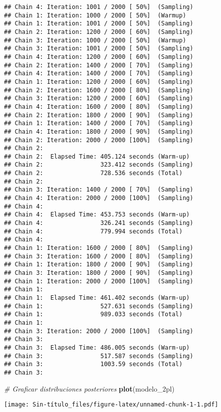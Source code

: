 \documentclass[
]{article}
\newenvironment{Shaded}{\begin{snugshade}}{\end{snugshade}}
\newcommand{\CommentTok}[1]{\textcolor[rgb]{0.56,0.35,0.01}{\textit{#1}}}
\newcommand{\FunctionTok}[1]{\textcolor[rgb]{0.13,0.29,0.53}{\textbf{#1}}}
\newcommand{\NormalTok}[1]{#1}
\begin{document}
\begin{verbatim}
## Chain 4: Iteration: 1001 / 2000 [ 50%]  (Sampling)
## Chain 1: Iteration: 1000 / 2000 [ 50%]  (Warmup)
## Chain 1: Iteration: 1001 / 2000 [ 50%]  (Sampling)
## Chain 2: Iteration: 1200 / 2000 [ 60%]  (Sampling)
## Chain 3: Iteration: 1000 / 2000 [ 50%]  (Warmup)
## Chain 3: Iteration: 1001 / 2000 [ 50%]  (Sampling)
## Chain 4: Iteration: 1200 / 2000 [ 60%]  (Sampling)
## Chain 2: Iteration: 1400 / 2000 [ 70%]  (Sampling)
## Chain 4: Iteration: 1400 / 2000 [ 70%]  (Sampling)
## Chain 1: Iteration: 1200 / 2000 [ 60%]  (Sampling)
## Chain 2: Iteration: 1600 / 2000 [ 80%]  (Sampling)
## Chain 3: Iteration: 1200 / 2000 [ 60%]  (Sampling)
## Chain 4: Iteration: 1600 / 2000 [ 80%]  (Sampling)
## Chain 2: Iteration: 1800 / 2000 [ 90%]  (Sampling)
## Chain 1: Iteration: 1400 / 2000 [ 70%]  (Sampling)
## Chain 4: Iteration: 1800 / 2000 [ 90%]  (Sampling)
## Chain 2: Iteration: 2000 / 2000 [100%]  (Sampling)
## Chain 2: 
## Chain 2:  Elapsed Time: 405.124 seconds (Warm-up)
## Chain 2:                323.412 seconds (Sampling)
## Chain 2:                728.536 seconds (Total)
## Chain 2: 
## Chain 3: Iteration: 1400 / 2000 [ 70%]  (Sampling)
## Chain 4: Iteration: 2000 / 2000 [100%]  (Sampling)
## Chain 4: 
## Chain 4:  Elapsed Time: 453.753 seconds (Warm-up)
## Chain 4:                326.241 seconds (Sampling)
## Chain 4:                779.994 seconds (Total)
## Chain 4: 
## Chain 1: Iteration: 1600 / 2000 [ 80%]  (Sampling)
## Chain 3: Iteration: 1600 / 2000 [ 80%]  (Sampling)
## Chain 1: Iteration: 1800 / 2000 [ 90%]  (Sampling)
## Chain 3: Iteration: 1800 / 2000 [ 90%]  (Sampling)
## Chain 1: Iteration: 2000 / 2000 [100%]  (Sampling)
## Chain 1: 
## Chain 1:  Elapsed Time: 461.402 seconds (Warm-up)
## Chain 1:                527.631 seconds (Sampling)
## Chain 1:                989.033 seconds (Total)
## Chain 1: 
## Chain 3: Iteration: 2000 / 2000 [100%]  (Sampling)
## Chain 3: 
## Chain 3:  Elapsed Time: 486.005 seconds (Warm-up)
## Chain 3:                517.587 seconds (Sampling)
## Chain 3:                1003.59 seconds (Total)
## Chain 3:
\end{verbatim}

\begin{Shaded}
\begin{Highlighting}[]
\CommentTok{\# Graficar distribuciones posteriores}
\FunctionTok{plot}\NormalTok{(modelo\_2pl)}
\end{Highlighting}
\end{Shaded}

\texttt{[image: Sin-título\_files/figure-latex/unnamed-chunk-1-1.pdf]}
\end{document}
